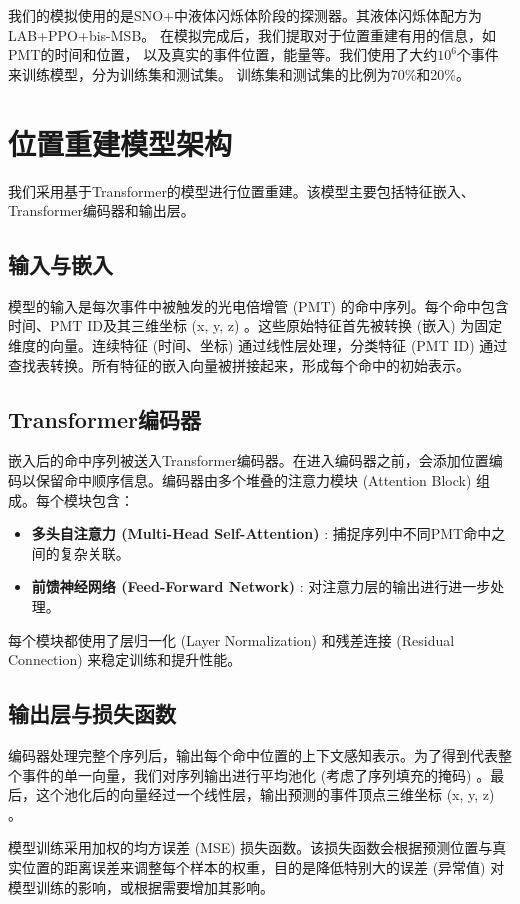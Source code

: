 我们的模拟使用的是SNO+中液体闪烁体阶段的探测器。其液体闪烁体配方为LAB+PPO+bis-MSB。
在模拟完成后，我们提取对于位置重建有用的信息，如PMT的时间和位置，
以及真实的事件位置，能量等。我们使用了大约$10^6$个事件来训练模型，分为训练集和测试集。
训练集和测试集的比例为70\%和20\%。

\section{位置重建模型架构}\label{model_architecture}

我们采用基于Transformer的模型进行位置重建。该模型主要包括特征嵌入、Transformer编码器和输出层。

\subsection{输入与嵌入}
模型的输入是每次事件中被触发的光电倍增管 (PMT) 的命中序列。每个命中包含时间、PMT ID及其三维坐标 (x, y, z) 。这些原始特征首先被转换 (嵌入) 为固定维度的向量。连续特征 (时间、坐标) 通过线性层处理，分类特征 (PMT ID) 通过查找表转换。所有特征的嵌入向量被拼接起来，形成每个命中的初始表示。

\subsection{Transformer编码器}
嵌入后的命中序列被送入Transformer编码器。在进入编码器之前，会添加位置编码以保留命中顺序信息。编码器由多个堆叠的注意力模块 (Attention Block) 组成。每个模块包含：
\begin{itemize}
    \item \textbf{多头自注意力 (Multi-Head Self-Attention) }: 捕捉序列中不同PMT命中之间的复杂关联。
    \item \textbf{前馈神经网络 (Feed-Forward Network) }: 对注意力层的输出进行进一步处理。
\end{itemize}
每个模块都使用了层归一化 (Layer Normalization) 和残差连接 (Residual Connection) 来稳定训练和提升性能。

\subsection{输出层与损失函数}
编码器处理完整个序列后，输出每个命中位置的上下文感知表示。为了得到代表整个事件的单一向量，我们对序列输出进行平均池化 (考虑了序列填充的掩码) 。最后，这个池化后的向量经过一个线性层，输出预测的事件顶点三维坐标 (x, y, z) 。

模型训练采用加权的均方误差 (MSE) 损失函数。该损失函数会根据预测位置与真实位置的距离误差来调整每个样本的权重，目的是降低特别大的误差 (异常值) 对模型训练的影响，或根据需要增加其影响。

